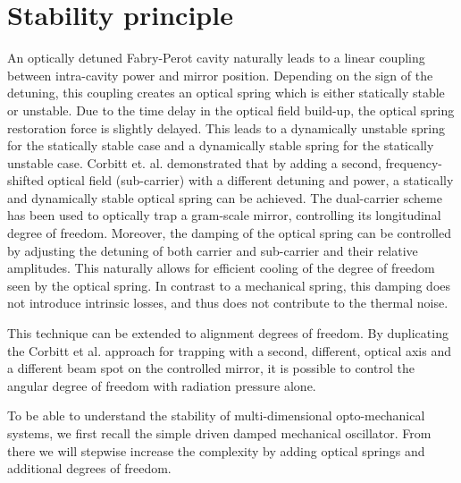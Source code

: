 \section{Stability principle}
\label{sec:II}

An optically detuned Fabry-Perot cavity naturally leads to a linear coupling between intra-cavity power and 
mirror position. Depending on the sign of the detuning, this coupling creates an optical spring which
is either statically stable or unstable. Due to the time delay in the optical field build-up, the optical spring 
restoration force is slightly delayed. This leads to a dynamically unstable spring for the statically stable case
and a dynamically stable spring for the statically unstable case. Corbitt et. al. \cite{Corbitt07} demonstrated that by adding a second, frequency-shifted optical field (sub-carrier) with a different detuning and power, a statically and dynamically stable optical spring can be achieved. The dual-carrier scheme has been used to optically trap a gram-scale mirror, controlling its longitudinal degree of freedom.
Moreover, the damping of the optical spring can be controlled by adjusting the detuning of both carrier and sub-carrier and their relative amplitudes. This naturally allows for efficient cooling of the degree of freedom seen by the optical spring. In contrast to a mechanical spring, this damping does not introduce intrinsic losses, and thus does not contribute to the thermal noise.

This technique can be extended to alignment degrees of freedom. By duplicating the Corbitt et al. approach for trapping 
with a second, different, optical axis and a different beam spot on the controlled mirror, it is possible to control the angular 
degree of freedom with radiation pressure alone.

To be able to understand the stability of multi-dimensional opto-mechanical systems, we first recall the simple driven damped mechanical oscillator. From there we will stepwise increase the complexity by adding optical springs and additional degrees of freedom. 

